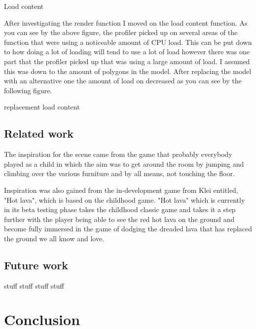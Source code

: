\documentclass[10pt, a4paper]{article}
\begin{document}
Load content

After investigating the render function I moved on the load content function. As you can see by the above figure, the profiler picked up on several areas of the function that were using a noticeable 
amount of CPU load. This can be put down to how doing a lot of loading will tend to use a lot of load however there was one part that the profiler picked up that was using a large 
amount of load. I assumed this was down to the amount of polygons in the model. After replacing the model with an alternative one the amount of load on decreased as you can see by the following figure.

replacement load content

   
\subsection{Related work}

The inspiration for the scene came from the game that
probably everybody played as a child in which the aim
was to get around the room by jumping and climbing over
the various furniture and by all means, not touching the
floor.

Inspiration was also gained from the in-development
game from Klei entitled, "Hot lava", which is based on
the childhood game. "Hot lava" which is currently in its
beta testing phase takes the childhood classic game and
takes it a step further with the player being able to see the
red hot lava on the ground and become fully immersed in
the game of dodging the dreaded lava that has replaced
the ground we all know and love.

\subsection{Future work}

stuff stuff stuff stuff	
\section{Conclusion}	


		
\end{document}

